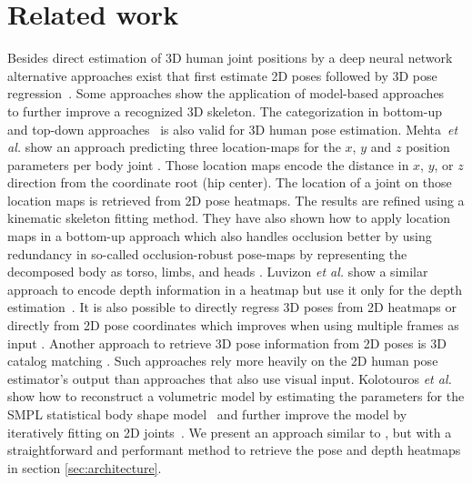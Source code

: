 \documentclass[a4paper, 10pt, conference]{ieeeconf}
\begin{document}
\section{Related work}
Besides direct estimation of 3D human joint positions by a deep neural network~\cite{mehtaVNectRealtime3D2017,mehtaSingleShotMultiperson3D2018,mehtaXNectRealtimeMultiperson2020,luvizonMultitaskDeepLearning2020} alternative approaches exist that first estimate 2D poses followed by 3D pose regression~\cite{chen3DHumanPose2017,pavllo3DHumanPose2019,tekinLearningFuse2D2017,zhou3DHumanPose2017,kolotourosLearningReconstruct3D2019}. Some approaches show the application of model-based approaches~\cite{bogoKeepItSMPL2016,zhouDeepKinematicPose2016,mehtaVNectRealtime3D2017,mehtaXNectRealtimeMultiperson2020,kolotourosLearningReconstruct3D2019} to further improve a recognized 3D skeleton. The categorization in bottom-up~\cite{mehtaSingleShotMultiperson3D2018} and top-down approaches~\cite{luvizon2D3DPose2018,mehtaVNectRealtime3D2017,mehtaXNectRealtimeMultiperson2020} is also valid for 3D human pose estimation. Mehta~\textit{et al.} show an approach predicting three location-maps for the $x$, $y$ and $z$ position parameters per body joint \cite{mehtaVNectRealtime3D2017}. Those location maps encode the distance in $x$, $y$, or $z$ direction from the coordinate root (hip center). The location of a joint on those location maps is retrieved from 2D pose heatmaps. The results are refined using a kinematic skeleton fitting method. They have also shown how to apply location maps in a bottom-up approach which also handles occlusion better by using redundancy in so-called occlusion-robust pose-maps by representing the decomposed body as torso, limbs, and heads \cite{mehtaSingleShotMultiperson3D2018}. Luvizon \textit{et al.} show a similar approach to encode depth information in a heatmap but use it only for the depth estimation~\cite{luvizonMultitaskDeepLearning2020}. It is also possible to directly regress 3D poses from 2D heatmaps \cite{tekinLearningFuse2D2017} or directly from 2D pose coordinates \cite{martinezSimpleEffectiveBaseline2017} which improves when using multiple frames as input \cite{pavllo3DHumanPose2019}. Another approach to retrieve 3D pose information from 2D poses is 3D catalog matching \cite{chen3DHumanPose2017}. Such approaches rely more heavily on the 2D human pose estimator's output than approaches that also use visual input. Kolotouros \textit{et al.} show how to reconstruct a volumetric model by estimating the parameters for the SMPL statistical body shape model~\cite{loperSMPLSkinnedMultiperson2015} and further improve the model by iteratively fitting on 2D joints~\cite{kolotourosLearningReconstruct3D2019}. We present an approach similar to \cite{luvizonMultitaskDeepLearning2020}, but with a straightforward and performant method to retrieve the pose and depth heatmaps in section \ref{sec:architecture}.
\end{document}
